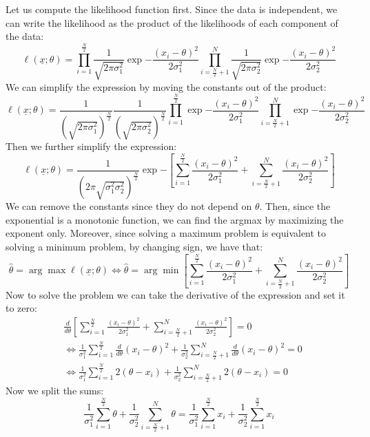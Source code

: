 Let us compute the likelihood function first. Since the data is independent, we can write the likelihood as the product of the likelihoods of each component of the data:
\[
    \ell(\underline x;\theta) = \prod_{i=1}^{\frac{N}{2}} \frac{1}{\sqrt{2\pi\sigma_1^2}} \exp{-\frac{(x_i - \theta)^2}{2\sigma_1^2}} \prod_{i=\frac{N}{2}+1}^{N} \frac{1}{\sqrt{2\pi\sigma_2^2}} \exp{-\frac{(x_i - \theta)^2}{2\sigma_2^2}}
\]
We can simplify the expression by moving the constants out of the product:
\[
    \ell(\underline x;\theta) = \frac{1}{\left(\sqrt{2\pi\sigma_1^2}\right)^{\frac{N}{2}}}  \frac{1}{\left(\sqrt{2\pi\sigma_2^2}\right)^{\frac {N}{2}}}  \prod_{i=1}^{\frac{N}{2}} \exp{-\frac{(x_i - \theta)^2}{2\sigma_1^2}} \prod_{i=\frac{N}{2}+1}^{N}\exp{-\frac{(x_i - \theta)^2}{2\sigma_2^2}}
\]
Then we further simplify the expression:
\[
    \ell(\underline x;\theta) = \frac{1}{\left(2\pi\sqrt{\sigma_1^2\sigma_2^2}\right)^{\frac{N}{2}}} \exp{ - \left[\sum_{i=1}^{\frac{N}{2}} \frac{(x_i - \theta)^2}{2\sigma_1^2} + \sum_{i=\frac{N}{2} + 1}^{N} \frac{(x_i - \theta)^2}{2\sigma_2^2}\right]}
\]
We can remove the constants since they do not depend on $\theta$. Then, since the exponential is a monotonic function, we can find the argmax by maximizing the exponent only. Moreover, since solving a maximum problem is equivalent to solving a minimum problem, by changing sign, we have that:
\[
    \hat{\theta} = \arg\max \ell(\underline x; \theta) \iff \hat{\theta} = \arg\min \left[\sum_{i=1}^{\frac{N}{2}} \frac{(x_i - \theta)^2}{2\sigma_1^2} + \sum_{i=\frac{N}{2} + 1}^{N} \frac{(x_i - \theta)^2}{2\sigma_2^2}\right]
\]
Now to solve the problem we can take the derivative of the expression and set it to zero:
\begin{align*}
     & \frac{d}{d\theta} \left[\sum_{i=1}^{\frac{N}{2}} \frac{(x_i - \theta)^2}{2\sigma_1^2} + \sum_{i=\frac{N}{2} + 1}^{N} \frac{(x_i - \theta)^2}{2\sigma_2^2}\right] = 0                      \\
     & \Leftrightarrow \frac{1}{\sigma_1^2} \sum_{i=1}^{\frac{N}{2}} \frac{d}{d\theta}(x_i - \theta)^2 + \frac{1}{\sigma_2^2} \sum_{i=\frac{N}{2} + 1}^{N} \frac{d}{d\theta}(x_i - \theta)^2 = 0 \\
     & \Leftrightarrow \frac{1}{\sigma_1^2} \sum_{i=1}^{\frac{N}{2}} 2(\theta -x_i) + \frac{1}{\sigma_2^2} \sum_{i=\frac{N}{2} + 1}^{N} 2(\theta - x_i) = 0
\end{align*}
Now we split the sums:
\[
    \frac{1}{\sigma_1^2} \sum_{i=1}^{\frac{N}{2}} \theta + \frac{1}{\sigma_2^2} \sum_{i=\frac{N}{2} + 1}^{N} \theta = \frac{1}{\sigma_1^2} \sum_{i=1}^{\frac{N}{2}} x_i + \frac{1}{\sigma_2^2} \sum_{i=1}^{\frac{N}{2}} x_i
\]

